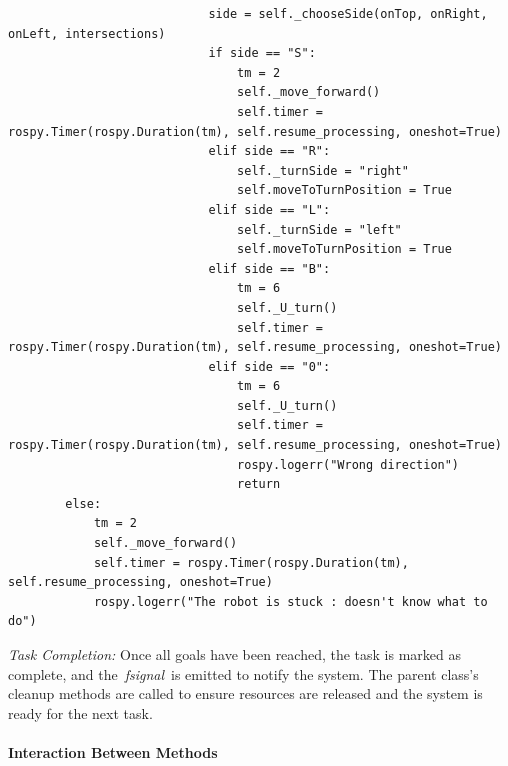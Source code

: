 \documentclass[a4paper,12pt]{extreport}
\begin{document}
\begin{verbatim}
                            side = self._chooseSide(onTop, onRight, onLeft, intersections)
                            if side == "S":
                                tm = 2
                                self._move_forward()        
                                self.timer = rospy.Timer(rospy.Duration(tm), self.resume_processing, oneshot=True)
                            elif side == "R":
                                self._turnSide = "right"
                                self.moveToTurnPosition = True
                            elif side == "L":
                                self._turnSide = "left"
                                self.moveToTurnPosition = True
                            elif side == "B":
                                tm = 6
                                self._U_turn()         
                                self.timer = rospy.Timer(rospy.Duration(tm), self.resume_processing, oneshot=True)
                            elif side == "0":
                                tm = 6
                                self._U_turn()         
                                self.timer = rospy.Timer(rospy.Duration(tm), self.resume_processing, oneshot=True)
                                rospy.logerr("Wrong direction")
                                return
        else:
            tm = 2
            self._move_forward()        
            self.timer = rospy.Timer(rospy.Duration(tm), self.resume_processing, oneshot=True)
            rospy.logerr("The robot is stuck : doesn't know what to do")
\end{verbatim}
\label{judeFig37}
\newpage
\emph{Task Completion:}
Once all goals have been reached, the task is marked as complete, and
the~\emph{fsignal}~is emitted to notify the system. The parent class's
cleanup methods are called to ensure resources are released and the
system is ready for the next task.

\paragraph{Interaction Between Methods}
\end{document}
